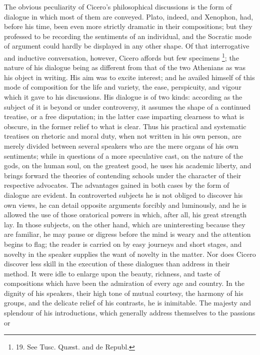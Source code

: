 The obvious peculiarity of
Cicero's philosophical discussions is the form of dialogue in which
most of them are conveyed. Plato, indeed, and Xenophon, had, before
his time, been even more strictly dramatic in their compositions; but they professed to be recording the sentiments of an
individual, and the Socratic mode of argument could hardly be
displayed in any other shape. Of that interrogative and inductive
conversation, however, Cicero affords but few specimens \footnote{19. See Tusc. Quæst. and de
Republ.}; the
nature of his dialogue being as different from that of the two
Athenians as was his object in writing. His aim was to excite
interest; and he availed himself of this mode of composition for the
life and variety, the ease, perspicuity, and vigour which it gave to
his discussions. His dialogue is of two kinds: according as the
subject of it is beyond or under controversy, it assumes the shape of
a continued treatise, or a free disputation; in the latter case
imparting clearness to what is obscure, in the former relief to what
is clear. Thus his practical and systematic treatises on rhetoric and
moral duty, when not written in his own person, are merely divided
between several speakers who are the mere organs of his own
sentiments; while in questions of a more speculative cast, on the
nature of the gods, on the human soul, on the greatest good, he uses
his academic liberty, and brings forward the theories of contending
schools under the character of their respective advocates. The
advantages gained in both cases by the form of dialogue are evident.
In controverted subjects he is not obliged to discover his own views,
he can detail opposite arguments forcibly and luminously, and he is
allowed the use of those oratorical powers in which, after all, his
great strength lay. In those subjects, on the other hand, which are
uninteresting because they are familiar, he may pause or digress
before the mind is weary and the attention begins to flag; the reader
is carried on by easy journeys and short stages, and novelty in the
speaker supplies the want of novelty in the matter. Nor does
Cicero discover less skill in the execution of these dialogues than
address in their method. It were idle to enlarge upon the beauty,
richness, and taste of compositions which have been the admiration of
every age and country. In the dignity of his speakers, their high tone
of mutual courtesy, the harmony of his groups, and the delicate relief
of his contrasts, he is inimitable. The majesty and splendour of his
introductions, which generally address themselves to the passions or
